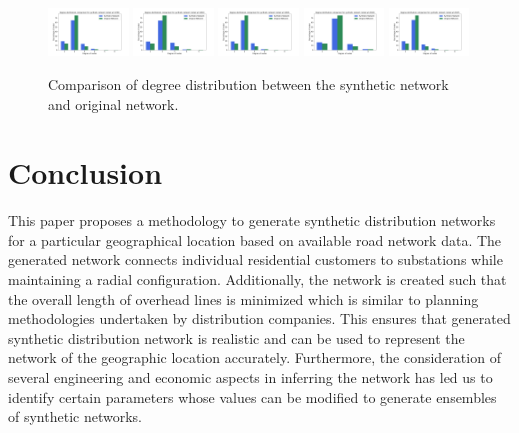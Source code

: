 \documentclass[sigconf]{acmart}
\begin{document}
\begin{figure}[htb]
	\centering
	\includegraphics[width=0.19\textwidth]{figs/34780-degree-dist.png}
	\includegraphics[width=0.19\textwidth]{figs/34810-degree-dist.png}
	\includegraphics[width=0.19\textwidth]{figs/34816-degree-dist.png}
	\includegraphics[width=0.19\textwidth]{figs/28228-degree-dist.png}
	\includegraphics[width=0.19\textwidth]{figs/28235-degree-dist.png}
	\caption{Comparison of degree distribution between the synthetic network and original network.}
	\label{fig:comparison}
\end{figure}

\section{Conclusion}
This paper proposes a methodology to generate synthetic distribution networks for a particular geographical location based on available road network data. The generated network connects individual residential customers to substations while maintaining a radial configuration. Additionally, the network is created such that the overall length of overhead lines is minimized which is similar to planning methodologies undertaken by distribution companies. This ensures that generated synthetic distribution network is realistic and can be used to represent the network of the geographic location accurately. Furthermore, the consideration of several engineering and economic aspects in inferring the network has led us to identify certain parameters whose values can be modified to generate ensembles of synthetic networks.


\end{document}
